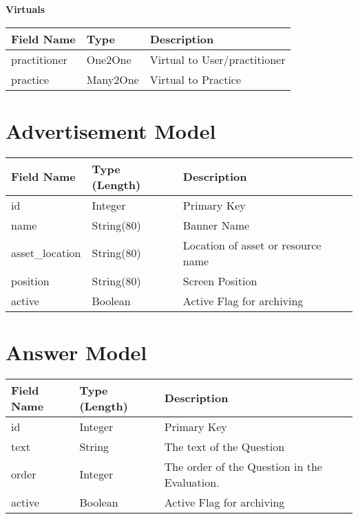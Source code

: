 \documentclass[letterpaper,10pt,english]{sphinxmanual}
\begin{document}
\textbf{Virtuals}

\begin{tabulary}{\linewidth}{|L|L|L|}
\hline
\textsf{\relax 
Field Name
} & \textsf{\relax 
Type
} & \textsf{\relax 
Description
}\\
\hline
practitioner
 & 
One2One
 & 
Virtual to User/practitioner
\\

practice
 & 
Many2One
 & 
Virtual to Practice
\\
\hline\end{tabulary}



\section{Advertisement Model}
\label{dev-models:advertisement-model}\label{dev-models:advertisement-model-label}
\begin{tabulary}{\linewidth}{|L|L|L|}
\hline
\textsf{\relax 
Field Name
} & \textsf{\relax 
Type (Length)
} & \textsf{\relax 
Description
}\\
\hline
id
 & 
Integer
 & 
Primary Key
\\

name
 & 
String(80)
 & 
Banner Name
\\

asset\_location
 & 
String(80)
 & 
Location of asset or resource name
\\

position
 & 
String(80)
 & 
Screen Position
\\

active
 & 
Boolean
 & 
Active Flag for archiving
\\
\hline\end{tabulary}



\section{Answer Model}
\label{dev-models:answer-model}\label{dev-models:answer-model-label}
\begin{tabulary}{\linewidth}{|L|L|L|}
\hline
\textsf{\relax 
Field Name
} & \textsf{\relax 
Type (Length)
} & \textsf{\relax 
Description
}\\
\hline
id
 & 
Integer
 & 
Primary Key
\\

text
 & 
String
 & 
The text of the Question
\\

order
 & 
Integer
 & 
The order of the Question in the
Evaluation.
\\

active
 & 
Boolean
 & 
Active Flag for archiving
\\
\hline\end{tabulary}
\end{document}
